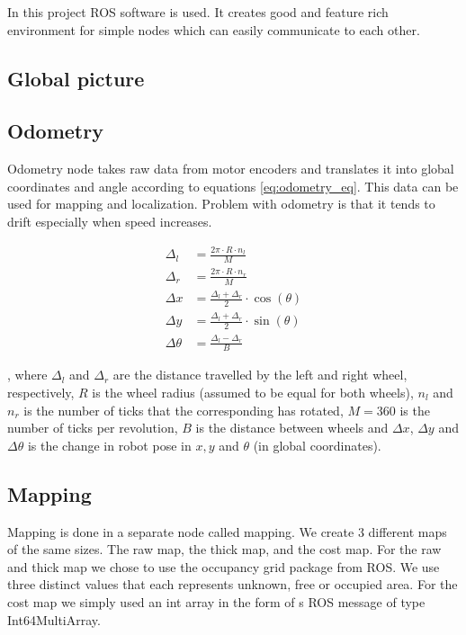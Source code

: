 In this project ROS software is used. It creates good and feature rich environment for simple nodes which can easily communicate to each other.

\subsection{Global picture}
\subsection{Odometry}

Odometry node takes raw data from motor encoders and translates it into global coordinates and angle according to equations \ref{eq:odometry_eq}. This data can be used for mapping and localization. Problem with odometry is that it tends to drift especially when speed increases.

\label{eq:odometry_eq}
\begin{align}
\Delta_{l} &= \frac{2\pi \cdot R \cdot n_{l}}{M}  \\
\Delta_{r} &= \frac{2\pi \cdot R \cdot n_{r}}{M} \\
\Delta x &= \frac{\Delta_{l} + \Delta_{r}}{2} \cdot \cos(\theta) \\
\Delta y &= \frac{\Delta_{l} + \Delta_{r}}{2} \cdot \sin(\theta) \\
\Delta \theta &= \frac{\Delta_{l} - \Delta_{r}}{B}
\end{align}

, where $\Delta_l$ and $\Delta_r$ are the distance travelled by the left and right wheel, respectively, $R$ is the wheel radius (assumed to be equal for both wheels), $n_l$ and $n_r$ is the number of ticks that the corresponding has rotated, $M = 360$ is the number of ticks per revolution, $B$ is the distance between wheels and $\Delta x$, $\Delta y$ and $\Delta\theta$ is the change in robot pose in $x,y$ and $\theta$ (in global coordinates).




\subsection{Mapping}
Mapping is done in a separate node called mapping. We create 3 different maps of the same sizes. The raw map, the thick map, and the cost map. For the raw and thick map we chose to use the occupancy grid package from ROS. We use three distinct values that each represents unknown, free or occupied area. For the cost map we simply used an int array in the form of s ROS message of type Int64MultiArray.

